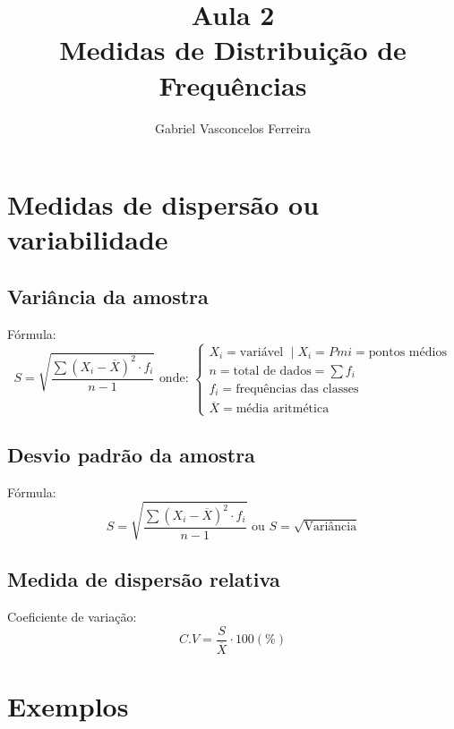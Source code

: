 \documentclass{jhwhw}
\begin{document}
\author{Gabriel Vasconcelos Ferreira}
\title{%
	Aula 2 \\
	\large Medidas de Distribuição de Frequências \\
}
\maketitle
\chapter{Medidas de dispersão ou variabilidade}
\section{Variância da amostra}
Fórmula:
\[
	\boxed{S = \sqrt{\frac{\sum{(X_i-\overline{X})^2\cdot f_i}}{n-1}}} \text{ onde: } \begin{cases}
		X_i = \text{variável } \mid X_i = Pmi = \text{pontos médios} \\
		n = \text{total de dados} = \sum{f_i}                        \\
		f_i = \text{frequências das classes}                         \\
		\overline{X} = \text{média aritmética}
	\end{cases}
\]
\section{Desvio padrão da amostra}
Fórmula:
\[
	\boxed{S = \sqrt{\frac{\sum{(X_i-\overline{X})^2\cdot f_i}}{n-1}}} \text{ ou } \boxed{S = \sqrt{\text{Variância}}}
\]
\section{Medida de dispersão relativa}
Coeficiente de variação:
\[
	C.V = \frac{S}{\overline{X}} \cdot 100 (\%)
\]
\chapter{Exemplos}
\end{document}
